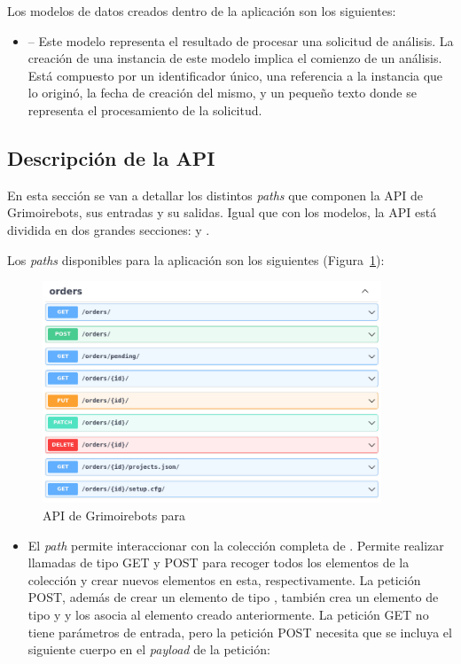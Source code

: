 Los modelos de datos creados dentro de la aplicación  son los siguientes:

\begin{itemize}
    \item {} -- Este modelo representa el resultado de procesar una solicitud de análisis. La creación de una instancia de este modelo implica el comienzo de un análisis. Está compuesto por un identificador único, una referencia a la instancia  que lo originó, la fecha de creación del mismo, y un pequeño texto donde se representa el procesamiento de la solicitud.
\end{itemize}

\subsection{Descripción de la API}

En esta sección se van a detallar los distintos \emph{paths} que componen la API de Grimoirebots, sus entradas y su salidas. Igual que con los modelos, la API está dividida en dos grandes secciones:  y .

Los \emph{paths} disponibles para la aplicación  son los siguientes (Figura~{\ref{fig:grimoirebots_api_orders}}):

\begin{figure}[ht]
    \centering
    \includegraphics[width=0.9\textwidth]{Figures/grimoirebots_api_orders}
    \decoRule
    \caption[Grimoirebots API ()]{API de Grimoirebots para }
    \label{fig:grimoirebots_api_orders}
\end{figure}

\begin{itemize}
    \item El \emph{path}  permite interaccionar con la colección completa de . Permite realizar llamadas de tipo GET y POST para recoger todos los elementos de la colección y crear nuevos elementos en esta, respectivamente. La petición POST, además de crear un elemento de tipo , también crea un elemento de tipo  y  y los asocia al elemento  creado anteriormente. La petición GET no tiene parámetros de entrada, pero la petición POST necesita que se incluya el siguiente cuerpo en el \emph{payload} de la petición:
\end{itemize}

